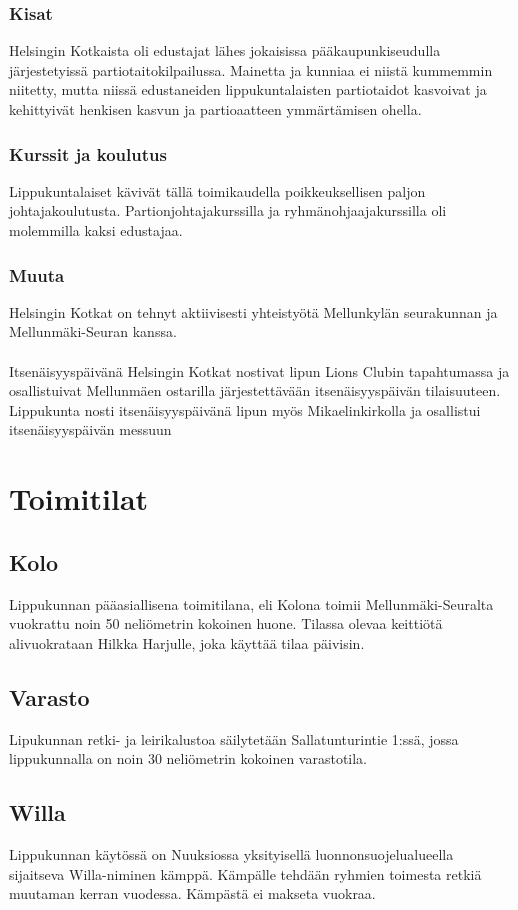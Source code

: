 \documentclass[a4paper, 12pt, finnish]{report} %
\begin{document}
\subsubsection{Kisat}
Helsingin Kotkaista oli edustajat lähes jokaisissa pääkaupunkiseudulla järjestetyissä partiotaitokilpailussa. Mainetta ja kunniaa ei niistä kummemmin niitetty, mutta niissä edustaneiden lippukuntalaisten partiotaidot kasvoivat ja kehittyivät henkisen kasvun ja partioaatteen ymmärtämisen ohella.
\subsubsection{Kurssit ja koulutus}
Lippukuntalaiset kävivät tällä toimikaudella poikkeuksellisen paljon johtajakoulutusta. Partionjohtajakurssilla ja ryhmänohjaajakurssilla oli molemmilla kaksi edustajaa.
\subsubsection{Muuta}
Helsingin Kotkat on tehnyt aktiivisesti yhteistyötä Mellunkylän seurakunnan ja Mellunmäki-Seuran kanssa.\\ 
\\Itsenäisyyspäivänä Helsingin Kotkat nostivat lipun Lions Clubin tapahtumassa ja osallistuivat Mellunmäen ostarilla järjestettävään itsenäisyyspäivän tilaisuuteen. Lippukunta nosti itsenäisyyspäivänä lipun myös Mikaelinkirkolla ja osallistui itsenäisyyspäivän messuun
\newpage
\section{Toimitilat}
\subsection{Kolo}
Lippukunnan pääasiallisena toimitilana, eli Kolona toimii Mellunmäki-Seuralta vuokrattu noin 50 neliömetrin kokoinen huone. Tilassa olevaa keittiötä alivuokrataan Hilkka Harjulle, joka käyttää tilaa päivisin.
\subsection{Varasto}
Lipukunnan retki- ja leirikalustoa säilytetään Sallatunturintie 1:ssä, jossa lippukunnalla on noin 30 neliömetrin kokoinen varastotila. 
\subsection{Willa}
Lippukunnan käytössä on Nuuksiossa yksityisellä luonnonsuojelualueella sijaitseva Willa-niminen kämppä. Kämpälle tehdään ryhmien toimesta retkiä muutaman kerran vuodessa. Kämpästä ei makseta vuokraa.
\end{document}
